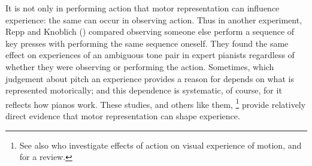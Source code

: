 \documentclass[12pt,\papersize]{extarticle}
\begin{document}
It is not only in performing action that motor representation can influence experience: the same can occur in observing action. Thus in another experiment, Repp and Knoblich (\citeyear{repp:2009_performed}) compared observing someone else perform a sequence of key presses with performing the same sequence oneself.  They found the same effect on experiences of an ambiguous tone pair in expert pianists regardless of whether they were observing or performing the action.
Sometimes, which judgement about pitch an experience provides a reason for depends on what is represented motorically; and this dependence is systematic, of course, for it reflects how pianos work.
These studies, and others like them,%
\footnote{
See also \citet{zwickel:2010_interference} who investigate effects of action on visual experience of motion, and \citet{schutz-bosbach:2007_perceptual} for a review.
}
provide relatively direct evidence that motor representation can shape experience.


    








\end{document}
